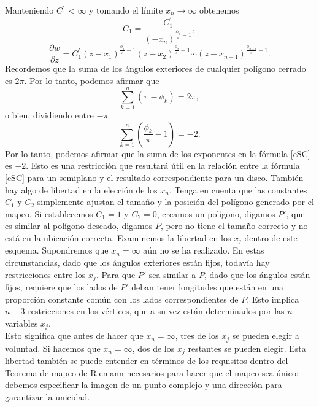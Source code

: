 Manteniendo  $C_1^{'}<\infty$ y tomando el límite $x_n\rightarrow \infty$ obtenemos 
$$C_1=\dfrac{C_1^{'}}{(-x_n)^{\frac{\phi_n}{\pi}-1}},$$
$$\dfrac{\partial w}{\partial z}=C_1^{'}(z-x_1)^{\frac{\phi_1}{\pi}-1}(z-x_2)^{\frac{\phi_2}{\pi}-1}\cdots(z-x_{n-1})^{\frac{\phi_{n-1}}{\pi}-1}.$$
Recordemos que la suma de los ángulos exteriores de cualquier polígono cerrado es $2\pi$. Por lo tanto, podemos afirmar que
$$\sum_{k=1}^{n}(\pi-\phi_k)=2\pi,$$
o bien, dividiendo entre $-\pi$
$$\sum_{k=1}^{n}\left(\dfrac{\phi_k}{\pi}-1\right)=-2.$$
Por lo tanto, podemos afirmar que la suma de los exponentes en la fórmula \ref{eSC} es $-2$. Esto es una restricción que resultará útil en la relación entre la fórmula \ref{eSC} para un semiplano y el resultado correspondiente para un disco. También hay algo de libertad en la elección de los $x_n$. Tenga en cuenta que las constantes $C_1$ y $C_2$ simplemente ajustan el tamaño y la posición del polígono generado por el mapeo. Si establecemos $C_1 = 1 $ y $C_2 = 0$, creamos un polígono, digamos $P'$, que es similar al polígono deseado, digamos $P$, pero no tiene el tamaño correcto y no está en la ubicación correcta. Examinemos la libertad en los $x_j$ dentro de este esquema. Supondremos que $x_n = \infty$ aún no se ha realizado. En estas circunstancias, dado que los ángulos exteriores están fijos, todavía hay restricciones entre los $x_j$. Para que $P'$ sea similar a $P$, dado que los ángulos están fijos, requiere que los lados de $P'$ deban tener longitudes que están en una proporción constante común con los lados correspondientes de $P$. Esto implica $n - 3$ restricciones en los vértices, que a su vez están determinados por las $n$ variables $x_j$.\\
Esto significa que antes de hacer que $x_n = \infty$, tres de los $x_j$ se pueden elegir a voluntad. Si hacemos que $x_n = \infty$, dos de los $x_j$ restantes se pueden elegir. Esta libertad también se puede entender en términos de los requisitos dentro del Teorema de mapeo de Riemann necesarios para hacer que el mapeo sea único: debemos especificar la imagen de un punto complejo  y una dirección para garantizar la unicidad.

